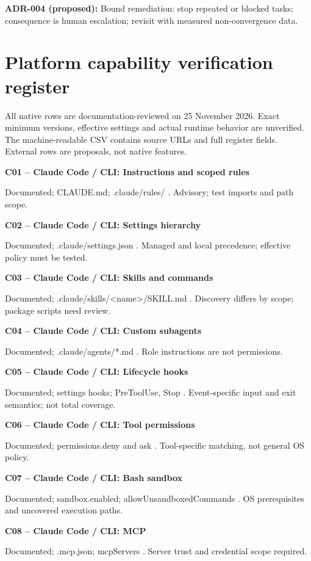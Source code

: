 \documentclass[11pt,letterpaper]{article}
\begin{document}
\textbf{ADR-004 (proposed):} Bound remediation: stop repeated or blocked tasks; consequence is human escalation; revisit with measured non-convergence data.

\clearpage\section{Platform capability verification register}
All native rows are documentation-reviewed on 25 November 2026. Exact minimum versions, effective settings and actual runtime behavior are unverified. The machine-readable CSV contains source URLs and full register fields. External rows are proposals, not native features.

\textbf{C01 -- Claude Code / CLI: Instructions and scoped rules}\par Documented; CLAUDE.md; .claude/rules/ \cite{cmem}. Advisory; test imports and path scope.

\textbf{C02 -- Claude Code / CLI: Settings hierarchy}\par Documented; .claude/settings.json \cite{csettings}. Managed and local precedence; effective policy must be tested.

\textbf{C03 -- Claude Code / CLI: Skills and commands}\par Documented; .claude/skills/\textless{}name\textgreater{}/SKILL.md \cite{cskills}. Discovery differs by scope; package scripts need review.

\textbf{C04 -- Claude Code / CLI: Custom subagents}\par Documented; .claude/agents/*.md \cite{cagents}. Role instructions are not permissions.

\textbf{C05 -- Claude Code / CLI: Lifecycle hooks}\par Documented; settings hooks; PreToolUse, Stop \cite{chooks}. Event-specific input and exit semantics; not total coverage.

\textbf{C06 -- Claude Code / CLI: Tool permissions}\par Documented; permissions.deny and ask \cite{cperm}. Tool-specific matching, not general OS policy.

\textbf{C07 -- Claude Code / CLI: Bash sandbox}\par Documented; sandbox.enabled; allowUnsandboxedCommands \cite{csandbox}. OS prerequisites and uncovered execution paths.

\textbf{C08 -- Claude Code / CLI: MCP}\par Documented; .mcp.json; mcpServers \cite{cmcp}. Server trust and credential scope required.
\end{document}
